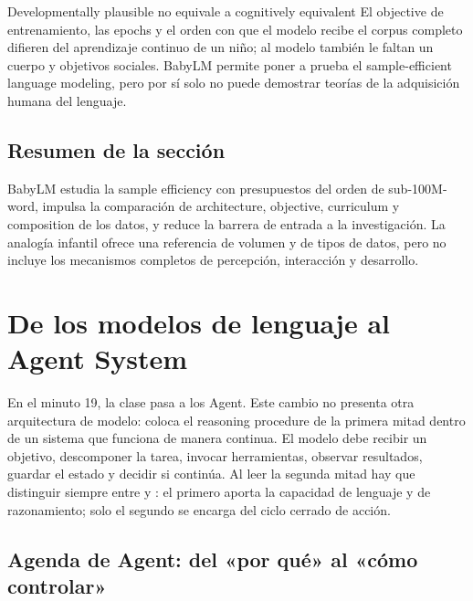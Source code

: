 \documentclass[a4paper]{article}
\begin{document}
\begin{warningbox}{Developmentally plausible no equivale a cognitively equivalent}
El objective de entrenamiento, las epochs y el orden con que el modelo recibe el corpus completo difieren del aprendizaje continuo de un niño; al modelo también le faltan un cuerpo y objetivos sociales. BabyLM permite poner a prueba el sample-efficient language modeling, pero por sí solo no puede demostrar teorías de la adquisición humana del lenguaje.
\end{warningbox}


\subsection{Resumen de la sección}

BabyLM estudia la sample efficiency con presupuestos del orden de sub-100M-word, impulsa la comparación de architecture, objective, curriculum y composition de los datos, y reduce la barrera de entrada a la investigación. La analogía infantil ofrece una referencia de volumen y de tipos de datos, pero no incluye los mecanismos completos de percepción, interacción y desarrollo.
\section{De los modelos de lenguaje al Agent System}

En el minuto 19, la clase pasa a los Agent. Este cambio no presenta otra arquitectura de modelo: coloca el reasoning procedure de la primera mitad dentro de un sistema que funciona de manera continua. El modelo debe recibir un objetivo, descomponer la tarea, invocar herramientas, observar resultados, guardar el estado y decidir si continúa. Al leer la segunda mitad hay que distinguir siempre entre  y : el primero aporta la capacidad de lenguaje y de razonamiento; solo el segundo se encarga del ciclo cerrado de acción.

\subsection{Agenda de Agent: del «por qué» al «cómo controlar»}
\end{document}
